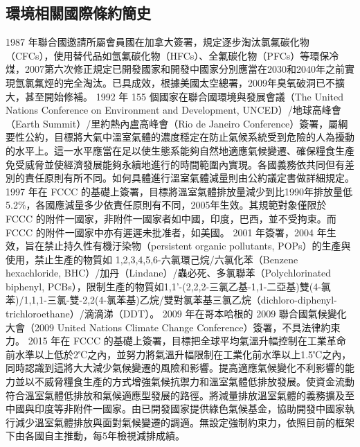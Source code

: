 \documentclass[a4paper,12pt]{report}
\begin{document}
\begin{itemize}
\subsection{環境相關國際條約簡史}
1987 年聯合國邀請所屬會員國在加拿大簽署，規定逐步淘汰氯氟碳化物（CFCs），使用替代品如氫氟碳化物（HFCs）、全氟碳化物（PFCs）等環保冷煤，2007第六次修正規定已開發國家和開發中國家分別應當在2030和2040年之前實現氫氯氟烴的完全淘汰。已具成效，根據美國太空總署，2009年臭氧破洞已不擴大，甚至開始修補。
1992 年 155 個國家在聯合國環境與發展會議（The United Nations Conference on Environment and Development, UNCED）/地球高峰會（Earth Summit）/里約熱內盧高峰會（Rio de Janeiro Conference）簽署，屬綱要性公約，目標將大氣中溫室氣體的濃度穩定在防止氣候系統受到危險的人為擾動的水平上。這一水平應當在足以使生態系能夠自然地適應氣候變遷、確保糧食生產免受威脅並使經濟發展能夠永續地進行的時間範圍內實現。各國義務依共同但有差別的責任原則有所不同。如何具體進行溫室氣體減量則由公約議定書做詳細規定。
1997 年在 FCCC 的基礎上簽署，目標將溫室氣體排放量減少到比1990年排放量低5.2\%，各國應減量多少依責任原則有不同，2005年生效。其規範對象僅限於 FCCC 的附件一國家，非附件一國家者如中國，印度，巴西，並不受拘束。而 FCCC 的附件一國家中亦有遲遲未批准者，如美國。
2001 年簽署，2004 年生效，旨在禁止持久性有機汙染物（persistent organic pollutants, POPs）的生產與使用，禁止生產的物質如 1,2,3,4,5,6-六氯環己烷/六氯化苯（Benzene hexachloride, BHC）/加丹（Lindane）/蟲必死、多氯聯苯（Polychlorinated biphenyl, PCBs），限制生產的物質如1,1'-(2,2,2-三氯乙基-1,1-二亞基)雙(4-氯苯)/1,1,1-三氯-雙-2,2(4-氯苯基)乙烷/雙對氯苯基三氯乙烷（dichloro-diphenyl-trichloroethane）/滴滴涕（DDT）。
2009 年在哥本哈根的 2009 聯合國氣候變化大會（2009 United Nations Climate Change Conference）簽署，不具法律約束力。
2015 年在 FCCC 的基礎上簽署，目標把全球平均氣溫升幅控制在工業革命前水準以上低於2℃之內，並努力將氣溫升幅限制在工業化前水準以上1.5℃之內，同時認識到這將大大減少氣候變遷的風險和影響。提高適應氣候變化不利影響的能力並以不威脅糧食生產的方式增強氣候抗禦力和溫室氣體低排放發展。使資金流動符合溫室氣體低排放和氣候適應型發展的路徑。將減量排放溫室氣體的義務擴及至中國與印度等非附件一國家。由已開發國家提供綠色氣候基金，協助開發中國家執行減少溫室氣體排放與面對氣候變遷的調適。無設定強制約束力，依照目前的框架下由各國自主推動，每5年檢視減排成績。

\end{itemize}
\end{document}
